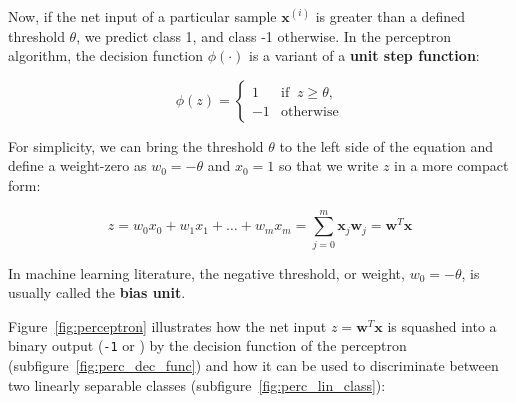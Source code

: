\documentclass[11pt]{article}
\newcommand{\vect}[1]{\boldsymbol{#1}}
\begin{document}
    Now, if the net input of a particular sample $\vect{x}^{(i)}$ is greater than a defined threshold $\theta$, we predict class 1, and class -1 otherwise.
    In the perceptron algorithm, the decision function $\phi( \cdot )$ is a variant of a \textbf{unit step function}:

    \begin{equation}
        \label{eq:perc_dec_func}
        \phi(z) =
        \begin{cases}
            1 & {\text{if }}\ z \geq \theta,\\
            -1 & {\text{otherwise}}
        \end{cases}
    \end{equation}

    For simplicity, we can bring the threshold $\theta$ to the left side of the equation and define a weight-zero as $w_0 = - \theta$ and $x_0 = 1$ so that we write $z$ in a more compact form:

    \begin{equation}
        \label{eq:perc_dec_func_bias}
        z = w_0 x_0 + w_1 x_1 + \dots + w_m x_m =
        \sum_{j=0}^m \vect{x}_j \vect{w}_j = \vect{w}^T \vect{x}
    \end{equation}

    In machine learning literature, the negative threshold, or weight, $w_0 = - \theta$, is usually called the \textbf{bias unit}.

    Figure~\ref{fig:perceptron} illustrates how the net input $ z = \vect{w}^T \vect{x} $ is squashed into a binary output (\texttt{-1} or ) by the decision function of the perceptron (subfigure~\ref{fig:perc_dec_func}) and how it can be used to discriminate between two linearly separable classes (subfigure~\ref{fig:perc_lin_class}):
\end{document}
